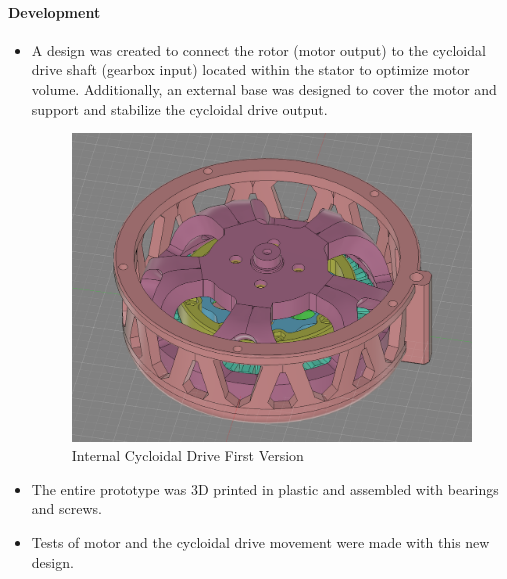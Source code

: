 \documentclass{article}
\begin{document}
\paragraph[short]{Development}
\begin{itemize}
    \item A design was created to connect the rotor (motor output) to the cycloidal drive shaft (gearbox input) located within the stator to optimize motor volume. Additionally, an external base was designed to cover the motor and support and stabilize the cycloidal drive output.
    
    \begin{figure}[H]
        \centering
        \includegraphics[width=\linewidth]{Images/Motor/InternalV1.png}
        \caption{Internal Cycloidal Drive First Version}
    \end{figure}
    \item The entire prototype was 3D printed in plastic and assembled with bearings and screws.
    \item Tests of motor and the cycloidal drive movement were made with this new design.
\end{itemize}
\end{document}
